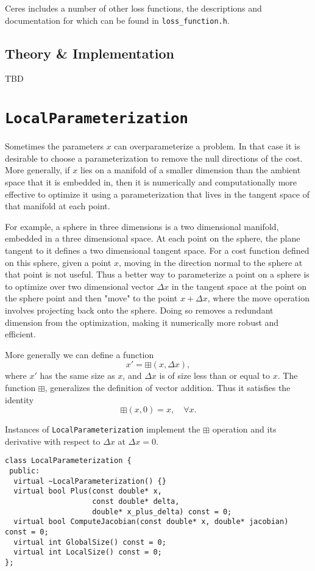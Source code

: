 Ceres includes a number of other loss functions, the descriptions and
documentation for which can be found in \texttt{loss\_function.h}.
\subsection{Theory \& Implementation}
TBD

\section{\texttt{LocalParameterization}}
Sometimes the parameters $x$ can overparameterize a problem. In
that case it is desirable to choose a parameterization to remove
the null directions of the cost. More generally, if $x$ lies on a
manifold of a smaller dimension than the ambient space that it is
embedded in, then it is numerically and computationally more
effective to optimize it using a parameterization that lives in
the tangent space of that manifold at each point.

For example, a sphere in three dimensions is a two dimensional
manifold, embedded in a three dimensional space. At each point on
the sphere, the plane tangent to it defines a two dimensional
tangent space. For a cost function defined on this sphere, given a
point $x$, moving in the direction normal to the sphere at that
point is not useful. Thus a better way to parameterize a point on
a sphere is to optimize over two dimensional vector $\Delta x$ in the
tangent space at the point on the sphere point and then "move" to
the point $x + \Delta x$, where the move operation involves projecting
back onto the sphere. Doing so removes a redundant dimension from
the optimization, making it numerically more robust and efficient.

More generally we can define a function
\begin{equation}
  x' = \boxplus(x, \Delta x),
\end{equation}
where $x'$ has the same size as $x$, and $\Delta x$ is of size less
than or equal to $x$. The function $\boxplus$, generalizes the
definition of vector addition. Thus it satisfies the identity
\begin{equation}
  \boxplus(x, 0) = x,\quad \forall x.
\end{equation}

Instances of \texttt{LocalParameterization} implement the $\boxplus$ operation and its derivative with respect to $\Delta x$ at $\Delta x = 0$.

\begin{verbatim}
class LocalParameterization {
 public:
  virtual ~LocalParameterization() {}
  virtual bool Plus(const double* x,
                    const double* delta,
                    double* x_plus_delta) const = 0;
  virtual bool ComputeJacobian(const double* x, double* jacobian) const = 0;
  virtual int GlobalSize() const = 0;
  virtual int LocalSize() const = 0;
};
\end{verbatim}

